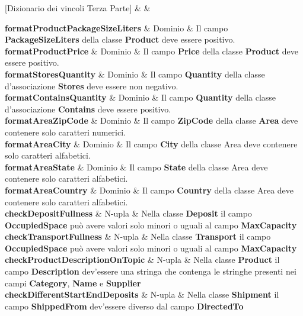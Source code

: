 [Dizionario dei vincoli Terza Parte]{ &  & }{
    
  \textbf{formatProductPackageSizeLiters} & Dominio & 
  {\footnotesize
  Il campo \textbf{PackageSizeLiters} della classe \textbf{Product} deve essere positivo.
  }\\ 

  \textbf{formatProductPrice} & Dominio & 
  {\footnotesize
  Il campo \textbf{Price} della classe \textbf{Product} deve essere positivo.
  }\\

  \textbf{formatStoresQuantity} & Dominio & 
  {\footnotesize
  Il campo \textbf{Quantity} della classe d'associazione \textbf{Stores} deve essere non negativo.
  }\\ %

  \textbf{formatContainsQuantity} & Dominio & 
  {\footnotesize
  Il campo \textbf{Quantity} della classe d'associazione \textbf{Contains} deve essere positivo.
  }\\

  \textbf{formatAreaZipCode} & Dominio & 
  {\footnotesize
  Il campo \textbf{ZipCode} della classe \textbf{Area} deve contenere solo caratteri numerici.
  }\\

  \textbf{formatAreaCity} & Dominio & 
  {\footnotesize
  Il campo \textbf{City} della classe Area deve contenere solo caratteri alfabetici.
  }\\
  
  \textbf{formatAreaState} & Dominio & 
  {\footnotesize
  Il campo \textbf{State} della classe Area deve contenere solo caratteri alfabetici.
  }\\
  
  \textbf{formatAreaCountry} & Dominio & 
  {\footnotesize
  Il campo \textbf{Country} della classe Area deve contenere solo caratteri alfabetici.
  }\\
  
  \textbf{checkDepositFullness} & N-upla & 
  {\footnotesize
  Nella classe \textbf{Deposit} il campo \textbf{OccupiedSpace} può avere valori solo minori o uguali al campo \textbf{MaxCapacity}
  }\\
  
  \textbf{checkTransportFullness} & N-upla & 
  {\footnotesize
  Nella classe \textbf{Transport} il campo \textbf{OccupiedSpace} può avere valori solo minori o uguali al campo \textbf{MaxCapacity}
  }\\
  
  \textbf{checkProductDescriptionOnTopic} & N-upla &
  {\footnotesize
  Nella classe \textbf{Product} il campo \textbf{Description} dev'essere una stringa che contenga le stringhe presenti nei campi \textbf{Category}, \textbf{Name} e \textbf{Supplier}
  }\\

  \textbf{checkDifferentStartEndDeposits} & N-upla &
  {\footnotesize
  Nella classe \textbf{Shipment} il campo \textbf{ShippedFrom} dev'essere diverso dal campo \textbf{DirectedTo}
  }\\
  
}

